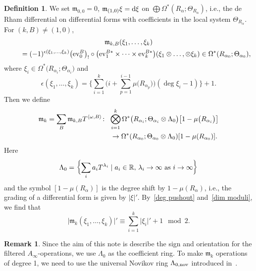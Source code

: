 \documentclass[pdftex]{sigma}
\numberwithin{equation}{section}
\theoremstyle{definition}
\newtheorem{defn}[thm]{Definition}
\newtheorem{rem}[thm]{Remark}
\begin{document}
\begin{defn}\label{def} We set
${\mathfrak m}_{0,0}=0$,
${\mathfrak m}_{(1,0)} \xi = {\rm d} \xi$ on $\bigoplus \Omega^*(R_{\alpha}; \Theta_{R_\alpha})$, i.e.,
the de Rham differential on differential forms with coefficients in the local system $\Theta_{R_\alpha}$.
For $(k,B) \neq (1,0)$,
\begin{gather*}
{\mathfrak m}_{k,B}(\xi_1, \dots, \xi_k) \\
\qquad{}= (-1)^{\epsilon(\xi_1, \dots, \xi_k)} \bigl({\rm ev}^B_0\bigr)_! \circ \bigl({\rm ev}_1^{B*} \times \dots \times {\rm ev}_k^{B*}\bigr) (\xi_1 \otimes \dots,\otimes \xi_k) \in \Omega^*(R_{\alpha_0};\Theta_{\alpha_0}),
\end{gather*}
where $\xi_i \in \Omega^*\bigl(R_{\alpha_i};\Theta_{\alpha_i}\bigr)$ and
\begin{equation}\label{epsilon}
\epsilon(\xi_1, \dots, \xi_k) = \Biggl\{ \sum_{i=1}^k \Biggl( i+\sum_{p=1}^{i-1}\mu \bigl( R_{\alpha_p} \bigr) \Biggr) (\deg \xi_i -1) \Biggr\} + 1.
\end{equation}
Then we define
\begin{gather*}
{\mathfrak m}_k=\sum_B {\mathfrak m}_{k,B} T^{\langle \omega, B \rangle} \colon \
\bigotimes_{i=1}^k \Omega^*\bigl(R_{\alpha_i};\Theta_{\alpha_i} \otimes \Lambda_0\bigr)\bigl[1 - \mu\bigl(R_{\alpha_i}\bigr)\bigr]\\
\hphantom{{\mathfrak m}_k=\sum_B {\mathfrak m}_{k,B} T^{\langle \omega, B \rangle} \colon} \
\to \Omega^*(R_{\alpha_0};\Theta_{\alpha_0} \otimes \Lambda_0)[1 - \mu(R_{\alpha_0})].
\end{gather*}
Here
\[\Lambda_0 = \biggl\{ \sum_i a_i T^{\lambda_i} \mid a_i \in {\mathbb R},\, \lambda_i \to \infty \ {\rm as} \ i \to \infty\biggr\}\]
and the symbol $[1 - \mu(R_{\alpha})]$ is the degree shift by $1 - \mu(R_{\alpha})$, i.e., the grading of a differential form is given by $\vert \xi \vert' $.
By~\eqref{deg pushout} and~\eqref{dim moduli}, we find that
\begin{equation}\label{deg m_k}
\vert {\mathfrak m}_k(\xi_1, \dots, \xi_k) \vert' \equiv \sum_{i=1}^k \vert \xi_i \vert' + 1 \mod 2.
\end{equation}
\end{defn}
\begin{rem}
Since the aim of this note is describe the sign and orientation for the filtered $A_{\infty}$-operations, we use $\Lambda_0$ as the coefficient ring.
To make ${\mathfrak m}_k$ operations of degree 1, we need to use the universal Novikov ring $\Lambda_{0,{\rm nov}}$ introduced in~\cite{FOOO09I}.
\end{rem}
\end{document}
